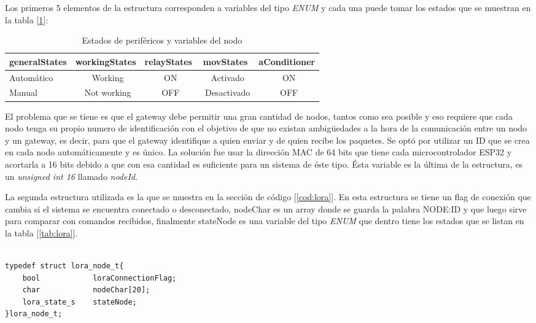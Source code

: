 Los primeros 5 elementos de la estructura corresponden a variables del tipo {\textit{ENUM}} y cada una puede tomar los estados que se muestran en la tabla [\ref{tab:estados}]:

\begin{table}[h]
	\centering
	\caption[Estados de periféricos y variables del nodo]{Estados de periféricos y variables del nodo}
	\begin{tabular}{l c c c c}    
		\toprule
		\textbf{generalStates}		& \textbf{workingStates}	& \textbf{relayStates}		& \textbf{movStates}	& \textbf{aConditioner}		\\
		\midrule
		Automático					& \ Working 				& \ ON						& \ Activado			& \ ON							\\
		Manual 						& \ Not working				& \ OFF						& \ Desactivado			& \ OFF							\\
		\bottomrule
		\hline
	\end{tabular}
	\label{tab:estados}
\end{table}

El problema que se tiene es que el gateway debe permitir una gran cantidad de nodos, tantos como sea posible y eso requiere que cada nodo tenga su propio numero de identificación con el objetivo de que no existan ambigüedades a la hora de la comunicación entre un nodo y un gateway, es decir, para que el gateway identifique a quien enviar y de quien recibe los paquetes.
Se optó por utilizar un ID que se crea en cada nodo automáticamente y es único. La solución fue usar la dirección MAC de 64 bits que tiene cada microcontrolador ESP32 y acortarla a 16 bits debido a que con esa cantidad es suficiente para un sistema de éste tipo. Ésta variable es la última de la estructura, es un {\textit{unsigned int 16}} llamado {\textit{nodeId}}. 

La segunda estructura utilizada es la que se muestra en la sección de código [\ref{cod:lora}]. En esta estructura se tiene un flag de conexión que cambia si el sistema se encuentra conectado o desconectado, nodeChar es un array donde se guarda la palabra NODE:ID y que luego sirve para comparar con comandos recibidos, finalmente stateNode es una variable del tipo {\textit{ENUM}} que dentro tiene los estados que se listan en la tabla [\ref{tab:lora}].

\begin{lstlisting}[label=cod:lora,caption=Estructura de control del protocolo LoRa] 

typedef struct lora_node_t{
    bool            loraConnectionFlag;
    char            nodeChar[20];
    lora_state_s    stateNode;
}lora_node_t;

\end{lstlisting}

